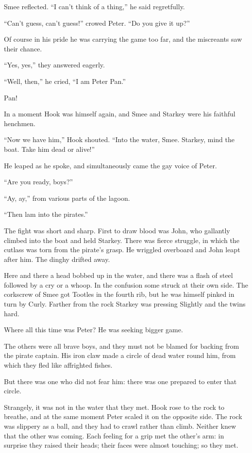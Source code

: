 Smee reflected. ``I can't think of a thing,'' he said regretfully.

``Can't guess, can't guess!'' crowed Peter. ``Do you give it up?''

Of course in his pride he was carrying the game too far, and the
miscreants saw their chance.

``Yes, yes,'' they answered eagerly.

``Well, then,'' he cried, ``I am Peter Pan.''

Pan!

In a moment Hook was himself again, and Smee and Starkey were his
faithful henchmen.

``Now we have him,'' Hook shouted. ``Into the water, Smee. Starkey, mind
the boat. Take him dead or alive!''

He leaped as he spoke, and simultaneously came the gay voice of Peter.

``Are you ready, boys?''

``Ay, ay,'' from various parts of the lagoon.

``Then lam into the pirates.''

The fight was short and sharp. First to draw blood was John, who
gallantly climbed into the boat and held Starkey. There was fierce
struggle, in which the cutlass was torn from the pirate's grasp. He
wriggled overboard and John leapt after him. The dinghy drifted away.

Here and there a head bobbed up in the water, and there was a flash of
steel followed by a cry or a whoop. In the confusion some struck at
their own side. The corkscrew of Smee got Tootles in the fourth rib,
but he was himself pinked in turn by Curly. Farther from the rock
Starkey was pressing Slightly and the twins hard.

Where all this time was Peter? He was seeking bigger game.

The others were all brave boys, and they must not be blamed for backing
from the pirate captain. His iron claw made a circle of dead water
round him, from which they fled like affrighted fishes.

But there was one who did not fear him: there was one prepared to enter
that circle.

Strangely, it was not in the water that they met. Hook rose to the rock
to breathe, and at the same moment Peter scaled it on the opposite
side. The rock was slippery as a ball, and they had to crawl rather
than climb. Neither knew that the other was coming. Each feeling for a
grip met the other's arm: in surprise they raised their heads; their
faces were almost touching; so they met.

